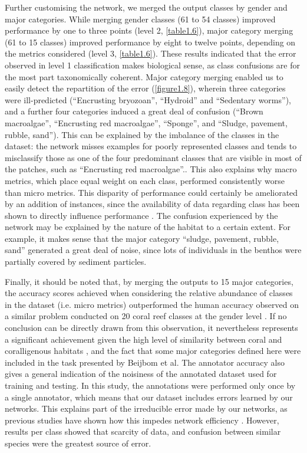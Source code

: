 Further customising the network, we merged the output classes by gender and major categories. While merging gender classes (61 to 54 classes) improved performance by one to three points (level 2, \autoref{table1.6}), major category merging (61 to 15 classes) improved performance by eight to twelve points, depending on the metrics considered (level 3, \autoref{table1.6}). These results indicated that the error observed in level 1 classification makes biological sense, as class confusions are for the most part taxonomically coherent. Major category merging enabled us to easily detect the repartition of the error (\autoref{figure1.8}), wherein three categories were ill-predicted (“Encrusting bryozoan”, “Hydroid” and “Sedentary worms”), and a further four categories induced a great deal of confusion (“Brown macroalgae”, “Encrusting red macroalgae”, “Sponge”, and “Sludge, pavement, rubble, sand”). This can be explained by the imbalance of the classes in the dataset: the network misses examples for poorly represented classes and tends to misclassify those as one of the four predominant classes that are visible in most of the patches, such as “Encrusting red macroalgae”.. This also explains why macro metrics, which place equal weight on each class, performed consistently worse than micro metrics. This disparity of performance could certainly be ameliorated by an addition of instances, since the availability of data regarding class has been shown to directly influence performance \citep{zhou_learning_2014}. The confusion experienced by the network may be explained by the nature of the habitat to a certain extent. For example, it makes sense that the major category “sludge, pavement, rubble, sand” generated a great deal of noise, since lots of individuals in the benthos were partially covered by sediment particles.

Finally, it should be noted that, by merging the outputs to 15 major categories, the accuracy scores achieved when considering the relative abundance of classes in the dataset (i.e. micro metrics) outperformed the human accuracy observed on a similar problem conducted on 20 coral reef classes at the gender level \citep{beijbom_towards_2015}. If no conclusion can be directly drawn from this observation, it nevertheless represents a significant achievement given the high level of similarity between coral and coralligenous habitats \citep{bianchi_biocostruzione_2001}, and the fact that some major categories defined here were included in the task presented by Beijbom et al. The annotator accuracy also gives a general indication of the noisiness of the annotated dataset used for training and testing. In this study, the annotations were performed only once by a single annotator, which means that our dataset includes errors learned by our networks. This explains part of the irreducible error made by our networks, as previous studies have shown how this impedes network efficiency \citep{mishkin_systematic_2016}. However, results per class showed that scarcity of data, and confusion between similar species were the greatest source of error. 

